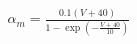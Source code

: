 \documentclass[preview]{standalone}
\begin{document}
\begin{align*}
\alpha_m = \frac{0.1 (V + 40)}{1 - \exp \left( -\frac{V + 40}{10} \right)}
\end{align*}
\end{document}
